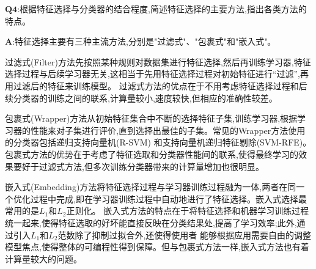 \documentclass[homework]{IEEEtran}
\begin{document}
\begin{CJK}{UTF8}{gkai}
$\mathbf{Q4}$:根据特征选择与分类器的结合程度,简述特征选择的主要方法,指出各类方法的特点。\par
$\mathbf{A}$:特征选择主要有三种主流方法,分别是"过滤式"、"包裹式"和"嵌入式"。\par
过滤式(Filter)方法先按照某种规则对数据集进行特征选择,然后再训练学习器,特征选择过程与后续学习器无关,这相当于先用特征选择过程对初始特征进行“过滤”,再用过滤后的特征来训练模型。
过滤式方法的优点在于不用考虑特征选择过程和后续分类器的训练之间的联系,计算量较小,速度较快,但相应的准确性较差。  \par
包裹式(Wrapper)方法从初始特征集合中不断的选择特征子集,训练学习器,根据学习器的性能来对子集进行评价,直到选择出最佳的子集。常见的Wrapper方法使用的分类器包括递归支持向量机(R-SVM)
和支持向量机递归特征剔除(SVM-RFE)。包裹式方法的优势在于考虑了特征选取和分类器性能间的联系,使得最终学习的效果要好于过滤式方法,但多次训练分类器带来的计算量增加也很明显。 \par
嵌入式(Embedding)方法将特征选择过程与学习器训练过程融为一体,两者在同一个优化过程中完成,即在学习器训练过程中自动地进行了特征选择。嵌入式选择最常用的是$L_1$和$L_2$正则化。
嵌入式方法的特点在于将特征选择和机器学习训练过程统一起来,使得特征选取的好坏能直接反映在分类结果处,提高了学习效率;此外,通过引入$L_1$和$L_2$范数除了抑制过拟合外,还使得使用者
能够根据应用需要自由的调整模型焦点,使得整体的可编程性得到保障。但与包裹式方法一样,嵌入式方法也有着计算量较大的问题。 \par
\end{CJK}

\clearpage
\end{document}
